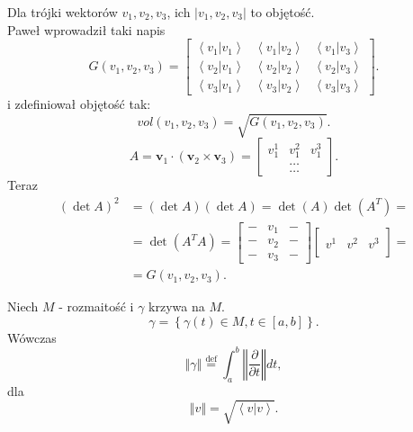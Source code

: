 \documentclass[../main.tex]{subfiles}
\begin{document}
    Dla trójki wektorów $v_1, v_2, v_3$, ich $\left| v_1, v_2, v_3 \right| $ to objętość.\\
    Paweł wprowadził taki napis
    \[
        G(v_1,v_2,v_3) = \begin{bmatrix} \left<v_1|v_1 \right>&\left<v_1|v_2 \right>&\left<v_1|v_3 \right>\\ \left<v_2|v_1 \right>&\left<v_2|v_2 \right>&\left<v_2|v_3 \right>\\ \left<v_3|v_1 \right>&\left<v_3|v_2 \right>&\left<v_3|v_3 \right> \end{bmatrix}
    .\]
i zdefiniował objętość tak:
 \[
     vol(v_1,v_2,v_3) = \sqrt{G(v_1,v_2,v_3)}
.\]
\[
    A = \mathbf{v}_1 \cdot (\mathbf{v}_2 \times \mathbf{v}_3) = \begin{bmatrix} v_1^1&v_1^2&v_1^3\\ &\ldots&\\ &\ldots &\end{bmatrix}
.\]
Teraz
\begin{align*}
    \left( \det A \right)^2 &= \left( \det A \right) \left( \det A \right) = \det(A)\det(A^T) =\\
    &= \det(A^TA) = \begin{bmatrix} -&v_1&-\\ -&v_2&-\\ -&v_3&- \end{bmatrix}\begin{bmatrix} &&\\ v^1&v^2&v^3\\ && \end{bmatrix} =\\
        &=G(v_1,v_2,v_3)
.\end{align*}
\begin{definicja}
    Niech $M$ - rozmaitość i $\gamma$ krzywa na $M$.
    \[
        \gamma = \left\{ \gamma(t)\in M, t\in[a,b] \right\}
    .\]
Wówczas
\[
\left\Vert \gamma \right\Vert \overset{\text{def}}{=} \int_a^b \left\Vert \frac{\partial }{\partial t}  \right\Vert dt
,\]
dla
\[
\left\Vert  v \right\Vert = \sqrt{\left<v|v \right>}
.\]
\end{definicja}
\end{document}

